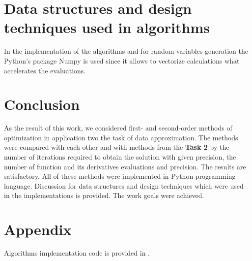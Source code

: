 \documentclass[12pt, bachelor, substylefile = algo_title.rtx]{disser}
\theoremstyle{definition}
\begin{document}
\section{Data structures and design techniques used in algorithms}


In the implementation of the algorithms and for random variables generation the Python's package Numpy is used since it allows to vectorize calculations what accelerates the evaluations. 


\section{Conclusion}
As the result of this work, we considered first- and second-order methods of optimization in application two the task of data approximation. The methods were compared with each other and with methods from the \textbf{Task 2} by the number of iterations required to obtain the solution with given precision, the number of function and its derivatives evaluations and precision. The results are satisfactory. All of these methods were implemented in Python programming language.
Discussion for data structures and design techniques which were used in the implementations is provided. The work goals were achieved.

\section{Appendix}
Algorithms implementation code is provided in \cite{repogithub}.

\nocite{Deisenroth2020}

{\small }

\end{document}
